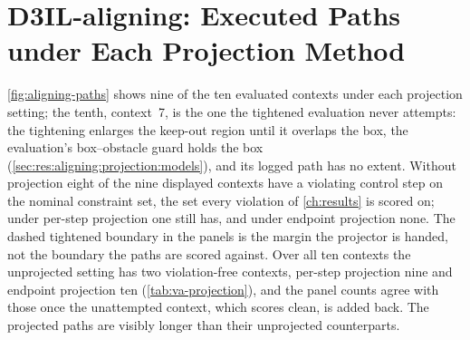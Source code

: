 \FloatBarrier

\section{D3IL-aligning: Executed Paths under Each Projection Method}\label{app:aligning-paths}

\autoref{fig:aligning-paths} shows nine of the ten evaluated contexts under each projection setting;
the tenth, context~7, is the one the tightened evaluation never attempts: the tightening enlarges the
keep-out region until it overlaps the box, the evaluation's box--obstacle guard holds the box
(\autoref{sec:res:aligning:projection:models}), and its logged path has no extent. Without projection
eight of the nine displayed contexts have a violating control step on the nominal constraint set, the
set every violation of \autoref{ch:results} is scored on; under per-step projection one still has, and
under endpoint projection none. The dashed tightened boundary in the panels is the margin the projector
is handed, not the boundary the paths are scored against. Over all ten contexts the unprojected setting
has two violation-free contexts, per-step projection nine and endpoint projection ten
(\autoref{tab:va-projection}), and the panel counts agree with those once the unattempted context,
which scores clean, is added back. The projected paths are visibly longer than their unprojected
counterparts.

